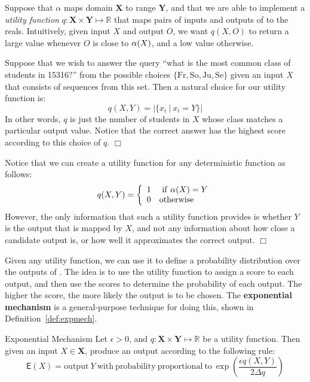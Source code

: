 \documentclass[11pt,twoside]{scrartcl}
\begin{document}
Suppose that $\alpha$ maps domain $\mathbf{X}$ to range $\mathbf{Y}$, and that we are able to implement a \emph{utility function} $q : \mathbf{X} \times \mathbf{Y} \mapsto \mathbb{R}$ that maps pairs of inputs and outputs of \san to the reals. 
Intuitively, given input $X$ and output $O$, we want $q(X,O)$ to return a large value whenever $O$ is close to $\alpha(X)$, and a low value otherwise.

\begin{example}
Suppose that we wish to answer the query ``what is the most common class of students in 15316?'' from the possible choices $\{\mathrm{Fr}, \mathrm{So}, \mathrm{Ju}, \mathrm{Se}\}$ given an input $X$ that consists of sequences from this set. Then a natural choice for our utility function is:
\begin{equation}
q(X,Y) = |\{x_i\ |\ x_i = Y\}|
\end{equation}
In other words, $q$ is just the number of students in $X$ whose class matches a particular output value. Notice that the correct answer has the highest score according to this choice of $q$.
$\Box$
\end{example}

\begin{example}
Notice that we can create a utility function for any deterministic function \san as follows:
\begin{equation}
q(X,Y) = 
\left\{
\begin{array}{ll}
1 & \mathrm{\ if\ } \alpha(X) = Y \\
0 & \mathrm{otherwise}
\end{array}
\right.
\end{equation}
However, the only information that such a utility function provides is whether $Y$ is the output that is mapped by $X$, and not any information about how close a candidate output is, or how well it approximates the correct output. 
$\Box$
\end{example}

Given any utility function, we can use it to define a probability distribution over the outputs of \san. The idea is to use the utility function to assign a score to each output, and then use the scores to determine the probability of each output. The higher the score, the more likely the output is to be chosen. The \textbf{exponential mechanism} is a general-purpose technique for doing this, shown in Definition~\ref{def:expmech}.

\begin{definition}{Exponential Mechanism}
\label{def:expmech}
Let $\epsilon > 0$, and $q : \mathbf{X} \times \mathbf{Y} \mapsto \mathbb{R}$ be a utility function. Then given an input $X \in \mathbf{X}$, produce an output according to the following rule:
\begin{equation}
\label{eq:expmech}
\mathsf{E}(X) = \mathrm{output\ } Y \mathrm{\ with\ probability\ proportional\ to\ } 
\exp\left(\frac{\epsilon q(X,Y)}{2\Delta q}\right)
\end{equation}
\end{definition}
\end{document}
